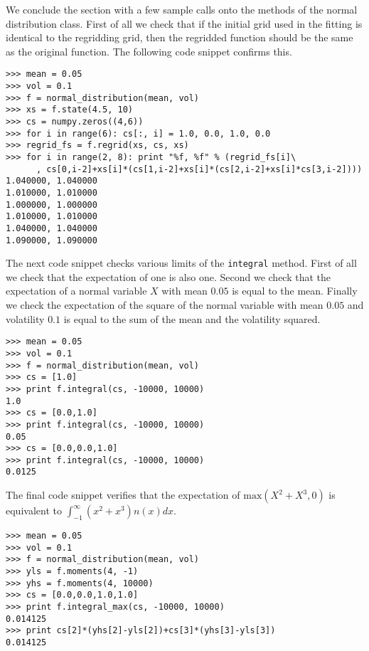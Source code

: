 We conclude the section with a few sample calls onto the methods of
the normal distribution class. First of all we check that if the
initial grid used in the fitting is identical to the regridding grid,
then the regridded function should be the same as the original
function. The following code snippet confirms this.
\begin{verbatim}
>>> mean = 0.05
>>> vol = 0.1
>>> f = normal_distribution(mean, vol)
>>> xs = f.state(4.5, 10)
>>> cs = numpy.zeros((4,6))
>>> for i in range(6): cs[:, i] = 1.0, 0.0, 1.0, 0.0
>>> regrid_fs = f.regrid(xs, cs, xs)
>>> for i in range(2, 8): print "%f, %f" % (regrid_fs[i]\
      , cs[0,i-2]+xs[i]*(cs[1,i-2]+xs[i]*(cs[2,i-2]+xs[i]*cs[3,i-2]))) 
1.040000, 1.040000
1.010000, 1.010000
1.000000, 1.000000
1.010000, 1.010000
1.040000, 1.040000
1.090000, 1.090000
\end{verbatim}

The next code snippet checks various limits of the \verb|integral|
method. First of all we check that the expectation of one is also
one. Second we check that the expectation of a normal variable $X$
with mean $0.05$ is equal to the mean. Finally we check the
expectation of the square of the normal variable with mean $0.05$ and
volatility $0.1$ is equal to the sum of the mean and the volatility
squared.
\begin{verbatim}
>>> mean = 0.05
>>> vol = 0.1
>>> f = normal_distribution(mean, vol)
>>> cs = [1.0]
>>> print f.integral(cs, -10000, 10000)
1.0
>>> cs = [0.0,1.0]
>>> print f.integral(cs, -10000, 10000)
0.05
>>> cs = [0.0,0.0,1.0]
>>> print f.integral(cs, -10000, 10000)
0.0125
\end{verbatim}

The final code snippet verifies that the expectation of
$\mbox{max}(X^2+X^3,0)$ is equivalent to $\int_{-1}^{\infty}
\left(x^2+x^3\right)n(x)dx$.
\begin{verbatim}
>>> mean = 0.05
>>> vol = 0.1
>>> f = normal_distribution(mean, vol)
>>> yls = f.moments(4, -1)
>>> yhs = f.moments(4, 10000)
>>> cs = [0.0,0.0,1.0,1.0]
>>> print f.integral_max(cs, -10000, 10000)
0.014125
>>> print cs[2]*(yhs[2]-yls[2])+cs[3]*(yhs[3]-yls[3])
0.014125
\end{verbatim}


